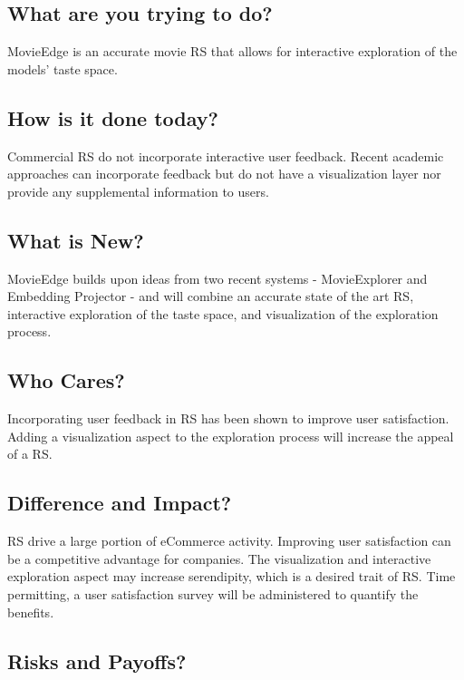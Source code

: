\subsection{What are you trying to do?} 

MovieEdge is an accurate movie RS that allows for interactive exploration of the models’ taste space. 

\subsection{How is it done today?}

Commercial RS do not incorporate interactive user feedback. Recent academic approaches can incorporate feedback but do not have a visualization layer nor provide any supplemental information to users.  

\subsection{What is New?}

MovieEdge builds upon ideas from two recent systems - MovieExplorer and Embedding Projector - and will combine an accurate state of the art RS, interactive exploration of the taste space, and visualization of the exploration process.  

\subsection{Who Cares?}

Incorporating user feedback in RS has been shown to improve user satisfaction. Adding a visualization aspect to the exploration process will increase the appeal of a RS. 

\subsection{Difference and Impact?}

RS drive a large portion of eCommerce activity. Improving user satisfaction can be a competitive advantage for companies. The visualization and interactive exploration aspect may increase serendipity, which is a desired trait of RS. Time permitting, a user satisfaction survey will be administered to quantify the benefits. 

\subsection{Risks and Payoffs?}

